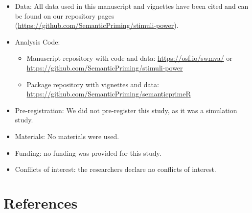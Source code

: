 \documentclass[
  man]{apa7}
\providecommand{\tightlist}{%
  \setlength{\itemsep}{0pt}\setlength{\parskip}{0pt}}
\begin{document}
\begin{itemize}
\tightlist
\item
  Data: All data used in this manuscript and vignettes have been cited and can be found on our repository pages (\url{https://github.com/SemanticPriming/stimuli-power}).
\item
  Analysis Code:

  \begin{itemize}
  \tightlist
  \item
    Manuscript repository with code and data: \url{https://osf.io/swmva/} or \url{https://github.com/SemanticPriming/stimuli-power}
  \item
    Package repository with vignettes and data: \url{https://github.com/SemanticPriming/semanticprimeR}
  \end{itemize}
\item
  Pre-registration: We did not pre-register this study, as it was a simulation study.
\item
  Materials: No materials were used.
\item
  Funding: no funding was provided for this study.
\item
  Conflicts of interest: the researchers declare no conflicts of interest.
\end{itemize}

\newpage

\section{References}\label{references}

\begingroup
\setlength{\parindent}{-0.5in}
\setlength{\leftskip}{0.5in}
\end{document}
